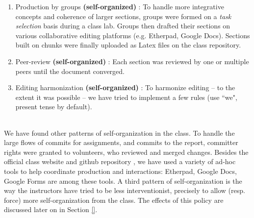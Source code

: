 \begin{enumerate}
  \item Production by groups {\bf (self-organized)} : To handle more integrative concepts and coherence of larger sections, groups were formed on a {\it task selection} basis during a class lab. Groups then drafted their sections on various collaborative editing platforms (e.g. Etherpad, Google Docs). Sections built on chunks were finally uploaded as Latex files on the class repository.
  \item Peer-review {\bf (self-organized)} : Each section was reviewed by one or multiple peers until the document converged.
  \item Editing harmonization {\bf (self-organized)} : To harmonize editing -- to the extent it was possible -- we have tried to implement a few rules (use ``we", present tense by default).
\end{enumerate}




\\ 
We have found other patterns of self-organization in the class. To handle the large flows of commits for assignments, and commits to the report, committer rights were granted to volunteers, who reviewed and merged changes. Besides 
the official class website and github repository \cite{classweb2013}, we have used a variety of ad-hoc tools to help coordinate production and interactions: Etherpad, Google Docs, Google Forms are among these tools. A third pattern of self-organization is the way the instructors have tried to be less interventionist, precisely to allow (resp. force) more self-organization from the class. The effects of this policy are discussed later on in Section \ref{}.



